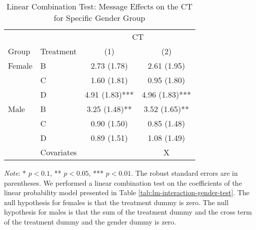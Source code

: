 \documentclass[12pt, a4paper]{article}
\begin{document}
\begin{table}[H]

\caption{\label{tab:lh-interaction-gender-test}Linear Combination Test: Message Effects on the CT for Specific Gender Group}
\centering
\fontsize{8}{10}\selectfont
\begin{threeparttable}
\begin{tabular}[t]{llcc}
\toprule
\multicolumn{2}{c}{ } & \multicolumn{2}{c}{CT} \\
\cmidrule(l{3pt}r{3pt}){3-4}
Group & Treatment & (1) & (2)\\
\midrule
Female & B & 2.73 (1.78) & 2.61 (1.95)\\
 & C & 1.60 (1.81) & 0.95 (1.80)\\
 & D & 4.91 (1.83)*** & 4.96 (1.83)***\\
Male & B & 3.25 (1.48)** & 3.52 (1.65)**\\
 & C & 0.90 (1.50) & 0.85 (1.48)\\
 & D & 0.89 (1.51) & 1.08 (1.49)\\
\midrule
 & Covariates &  & X\\
\bottomrule
\end{tabular}
\begin{tablenotes}
\item \emph{Note}: * $p < 0.1$, ** $p < 0.05$, *** $p < 0.01$. The robust standard errors are in parentheses. We performed a linear combination test on the coefficients of the linear probability model presented in Table \ref{tab:lm-interaction-gender-test}. The null hypothesis for females is that the treatment dummy is zero. The null hypothesis for males is that the sum of the treatment dummy and the cross term of the treatment dummy and the gender dummy is zero.
\end{tablenotes}
\end{threeparttable}
\end{table}
\end{document}
